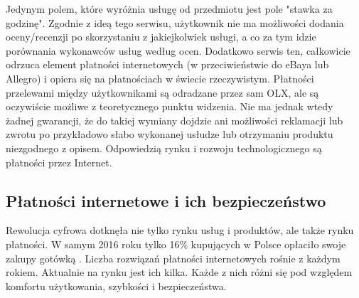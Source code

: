 \documentclass[12pt]{article}
\numberwithin{figure}{section}
\begin{document}
\begin{sloppypar}
Jedynym polem, które wyróżnia usługę od przedmiotu jest pole "stawka za godzinę". Zgodnie z ideą tego serwisu, użytkownik nie ma możliwości dodania oceny/recenzji po skorzystaniu z jakiejkolwiek usługi, a co za tym idzie porównania wykonawców usług według ocen. Dodatkowo serwis ten, całkowicie odrzuca element płatności internetowych (w przeciwieństwie do eBaya lub Allegro) i opiera się na płatnościach w świecie rzeczywistym. Płatności przelewami między użytkownikami są odradzane przez sam OLX, ale są oczywiście możliwe z teoretycznego punktu widzenia. Nie ma jednak wtedy żadnej gwarancji, że do takiej wymiany dojdzie ani możliwości reklamacji lub zwrotu po przykładowo słabo wykonanej usłudze lub otrzymaniu produktu niezgodnego z opisem. Odpowiedzią rynku i rozwoju technologicznego są płatności przez Internet.

\subsection{Płatności internetowe i ich bezpieczeństwo} \label{sec:payments}
Rewolucja cyfrowa dotknęła nie tylko rynku usług i produktów, ale także rynku płatności. W samym 2016 roku tylko 16\% kupujących w Polsce opłaciło swoje zakupy gotówką \cite{gotowka}. Liczba rozwiązań płatności internetowych rośnie z każdym rokiem. Aktualnie na rynku jest ich kilka. Każde z nich różni się pod względem komfortu użytkowania, szybkości i bezpieczeństwa. 


\end{sloppypar}
\end{document}
